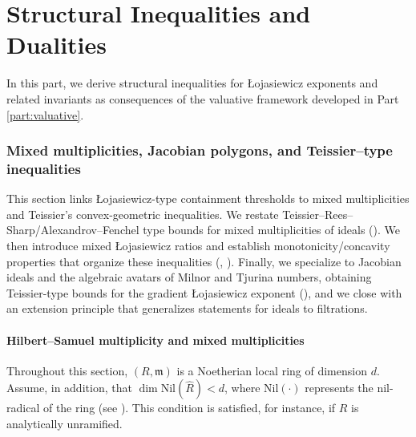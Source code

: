 \documentclass[12pt]{amsart}
\newcommand{\m}{\mathfrak m}
\theoremstyle{plain}
\theoremstyle{definition}
\numberwithin{equation}{section}
\begin{document}

\part{Structural Inequalities and Dualities} \label{part:structuralInequality}

In this part, we derive structural inequalities for
\L{}ojasiewicz exponents and related invariants as consequences of the valuative
framework developed in Part \ref{part:valuative}.


\section{Mixed multiplicities, Jacobian polygons, and Teissier--type inequalities}\label{sec:teissier}

This section links \L{}ojasiewicz-type containment thresholds to mixed multiplicities and Teissier’s convex-geometric inequalities.  We restate Teissier--Rees--Sharp/Alexandrov--Fenchel type bounds for mixed multiplicities of ideals ().  We then introduce mixed \L{}ojasiewicz ratios and establish monotonicity/concavity properties that organize these inequalities (, ).  Finally, we specialize to Jacobian ideals and the algebraic avatars of Milnor and Tjurina numbers, obtaining Teissier-type bounds for the gradient \L{}ojasiewicz exponent (), and we close with an extension principle that generalizes statements for ideals to filtrations.

\subsection{Hilbert--Samuel multiplicity and mixed multiplicities}\label{subsec:mixedmult-prep}

Throughout this section, $(R,\m)$ is a Noetherian local ring of dimension $d$. Assume, in addition, that $\dim \text{Nil}(\widehat{R}) < d$, where $\text{Nil}(\cdot)$ represents the nil-radical of the ring (see \cite{CutkoskyAM}). This condition is satisfied, for instance, if $R$ is analytically unramified.
\end{document}
